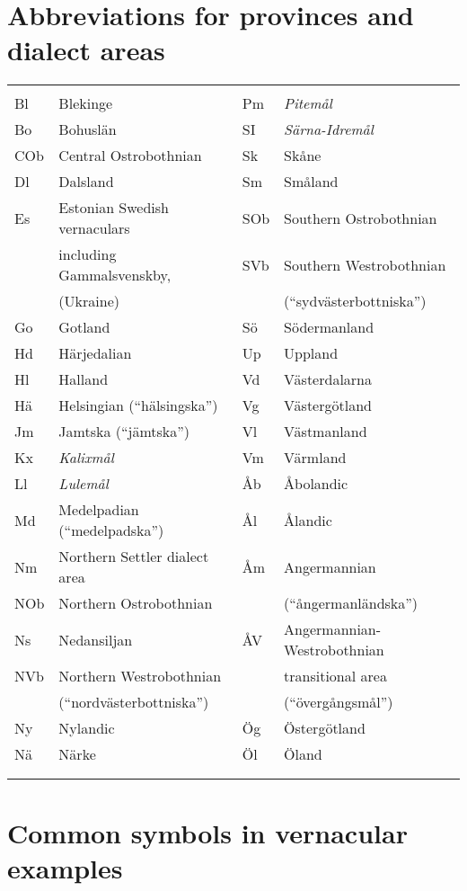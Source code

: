 \chapter[Abbreviations for provinces and dialect areas]{Abbreviations for provinces and dialect areas}

\begin{tabular}{llll}
\lsptoprule
\multicolumn{4}{l}{Be

}\\
Bl & Blekinge & Pm & {\itshape Pitemål}\\
Bo & Bohuslän & SI & {\itshape Särna-Idremål}\\
COb & Central Ostrobothnian & Sk & Skåne\\
Dl & Dalsland & Sm & Småland\\
Es & Estonian Swedish vernaculars & SOb & Southern Ostrobothnian\\
& including Gammalsvenskby, & SVb & Southern Westrobothnian\\
& (Ukraine) &  & (“sydvästerbottniska”)\\
Go & Gotland & Sö & Södermanland\\
Hd & Härjedalian & Up & Uppland\\
Hl & Halland & Vd & Västerdalarna\\
Hä & Helsingian (“hälsingska”) & Vg & Västergötland\\
Jm & Jamtska (“jämtska”) & Vl & Västmanland\\
Kx & {\itshape Kalixmål} & Vm & Värmland\\
Ll & {\itshape Lulemål} & Åb & Åbolandic\\
Md & Medelpadian (“medelpadska”) & Ål & Ålandic\\
Nm & Northern Settler dialect area & Åm & Angermannian\\
NOb & Northern Ostrobothnian &  & (“ångermanländska”)\\
Ns & Nedansiljan & ÅV & Angermannian-Westrobothnian\\
NVb & Northern Westrobothnian &  & transitional area\\
& (“nordvästerbottniska”) &  & (“övergångsmål”)\\
Ny & Nylandic & Ög & Östergötland\\
Nä & Närke & Öl & Öland\\
&  &  & \\
\lspbottomrule
\end{tabular}

\chapter[Common symbols in vernacular examples]{Common symbols in vernacular examples}
\label{bkm:Ref224104485}

